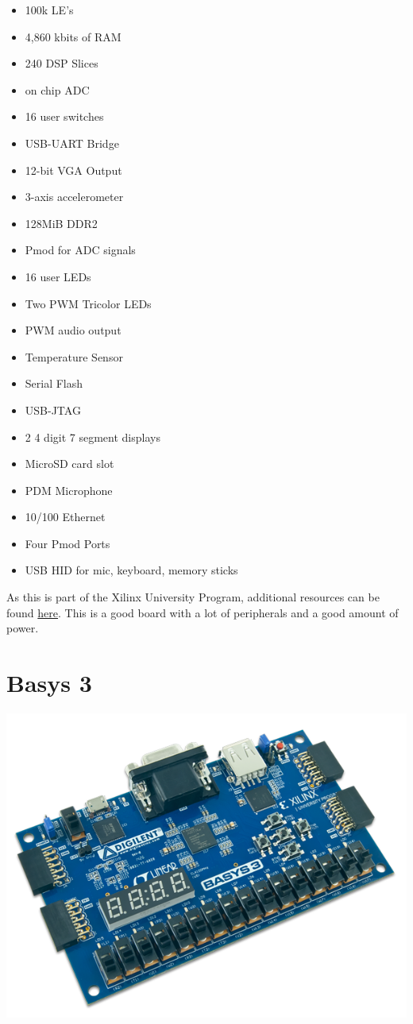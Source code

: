 \documentclass{article}
\begin{document}
	\begin{itemize}
	\item 100k LE's
	\item 4,860 kbits of RAM
	\item 240 DSP Slices
	\item on chip ADC
	\item 16 user switches
	\item USB-UART Bridge
	\item 12-bit VGA Output
	\item 3-axis accelerometer
	\item 128MiB DDR2
	\item Pmod for ADC signals
	\item 16 user LEDs
	\item Two PWM Tricolor LEDs
	\item PWM audio output
	\item Temperature Sensor
	\item Serial Flash
	\item USB-JTAG
	\item 2 4 digit 7 segment displays
	\item MicroSD card slot
	\item PDM Microphone
	\item 10/100 Ethernet
	\item Four Pmod Ports
	\item USB HID for mic, keyboard, memory sticks
	\end{itemize}
	
	As this is part of the Xilinx University Program, additional resources can be found 
	\href{http://www.xilinx.com/support/university/boards-portfolio/xup-boards/Nexys4BoardDDR.html}{here}.
	This is a good board with a lot of peripherals and a good amount of power. 	

	\newpage
	\section{Basys 3}
	\includegraphics[scale=0.5]{Basys3}
	
\end{document}

